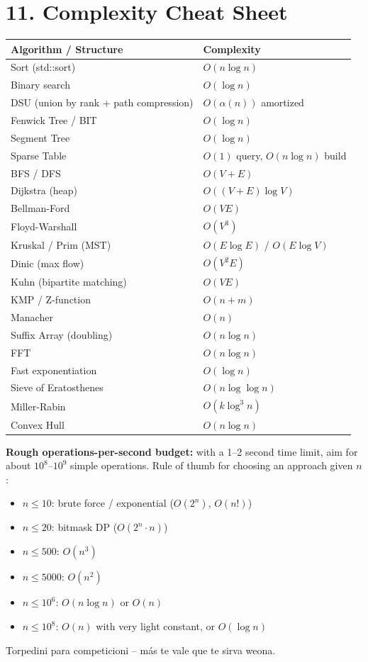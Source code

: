 \documentclass[11pt]{extarticle}
\begin{document}
\section*{11. Complexity Cheat Sheet}
\begin{center}
\renewcommand{\arraystretch}{1.3}
\begin{tabular}{|l|l|}
\hline
\textbf{Algorithm / Structure} & \textbf{Complexity} \\
\hline
Sort (std::sort) & $O(n \log n)$ \\
Binary search & $O(\log n)$ \\
DSU (union by rank + path compression) & $O(\alpha(n))$ amortized \\
Fenwick Tree / BIT & $O(\log n)$ \\
Segment Tree & $O(\log n)$ \\
Sparse Table & $O(1)$ query, $O(n\log n)$ build \\
BFS / DFS & $O(V+E)$ \\
Dijkstra (heap) & $O((V+E)\log V)$ \\
Bellman-Ford & $O(VE)$ \\
Floyd-Warshall & $O(V^3)$ \\
Kruskal / Prim (MST) & $O(E \log E)$ / $O(E \log V)$ \\
Dinic (max flow) & $O(V^2E)$ \\
Kuhn (bipartite matching) & $O(VE)$ \\
KMP / Z-function & $O(n+m)$ \\
Manacher & $O(n)$ \\
Suffix Array (doubling) & $O(n \log n)$ \\
FFT & $O(n \log n)$ \\
Fast exponentiation & $O(\log n)$ \\
Sieve of Eratosthenes & $O(n \log \log n)$ \\
Miller-Rabin & $O(k \log^3 n)$ \\
Convex Hull & $O(n \log n)$ \\
\hline
\end{tabular}
\end{center}

\textbf{Rough operations-per-second budget:} with a 1--2 second time
limit, aim for about $10^8$--$10^9$ simple operations. Rule of thumb
for choosing an approach given $n$:
\begin{itemize}[leftmargin=1.2em,itemsep=1pt,topsep=3pt]
\item $n \le 10$: brute force / exponential ($O(2^n)$, $O(n!)$)
\item $n \le 20$: bitmask DP ($O(2^n \cdot n)$)
\item $n \le 500$: $O(n^3)$
\item $n \le 5000$: $O(n^2)$
\item $n \le 10^6$: $O(n \log n)$ or $O(n)$
\item $n \le 10^8$: $O(n)$ with very light constant, or $O(\log n)$
\end{itemize}

\vspace{10pt}
\begin{center}\small
Torpedini para competicioni -- más te vale que te sirva weona.
\end{center}
\end{document}
